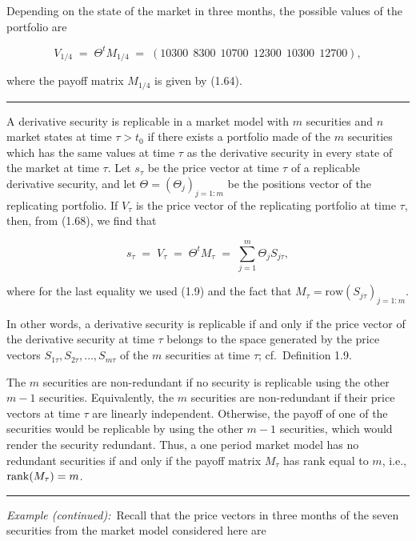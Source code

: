 Depending on the state of the market in three months, the possible values
of the portfolio are

\[
V_{1/4} \;=\; \Theta^tM_{1/4} \;=\; (10300\ \ 8300\ \ 10700\ \ 12300\ \ 10300\ \ 12700),
\]

where the payoff matrix $M_{1/4}$ is given by (1.64).

\medskip
\noindent\rule{\linewidth}{0.4pt}
\medskip

A derivative security is replicable in a market model with $m$ securities
and $n$ market states at time $\tau>t_0$ if there exists a portfolio made
of the $m$ securities which has the same values at time $\tau$ as the
derivative security in every state of the market at time $\tau$. Let
$s_\tau$ be the price vector at time $\tau$ of a replicable derivative
security, and let $\Theta=(\Theta_j)_{j=1:m}$ be the positions vector of
the replicating portfolio. If $V_\tau$ is the price vector of the
replicating portfolio at time $\tau$, then, from (1.68), we find that

\begin{equation}
s_\tau \;=\; V_\tau \;=\; \Theta^tM_\tau \;=\; \sum_{j=1}^m \Theta_jS_{j\tau},
\end{equation}

where for the last equality we used (1.9) and the fact that
$M_\tau=\mathrm{row}(S_{j\tau})_{j=1:m}$.

In other words, a derivative security is replicable if and only if the
price vector of the derivative security at time $\tau$ belongs to the
space generated by the price vectors $S_{1\tau}, S_{2\tau}, \ldots,
S_{m\tau}$ of the $m$ securities at time $\tau$; cf.\ Definition 1.9.

The $m$ securities are non-redundant if no security is replicable using
the other $m-1$ securities. Equivalently, the $m$ securities are
non-redundant if their price vectors at time $\tau$ are linearly
independent. Otherwise, the payoff of one of the securities would be
replicable by using the other $m-1$ securities, which would render the
security redundant. Thus, a one period market model has no redundant
securities if and only if the payoff matrix $M_\tau$ has rank equal to
$m$, i.e., $\operatorname{rank}(M_\tau)=m$.

\medskip
\noindent\rule{\linewidth}{0.4pt}
\medskip

\noindent\textit{Example (continued):}\ Recall that the price vectors in
three months of the seven securities from the market model considered
here are

